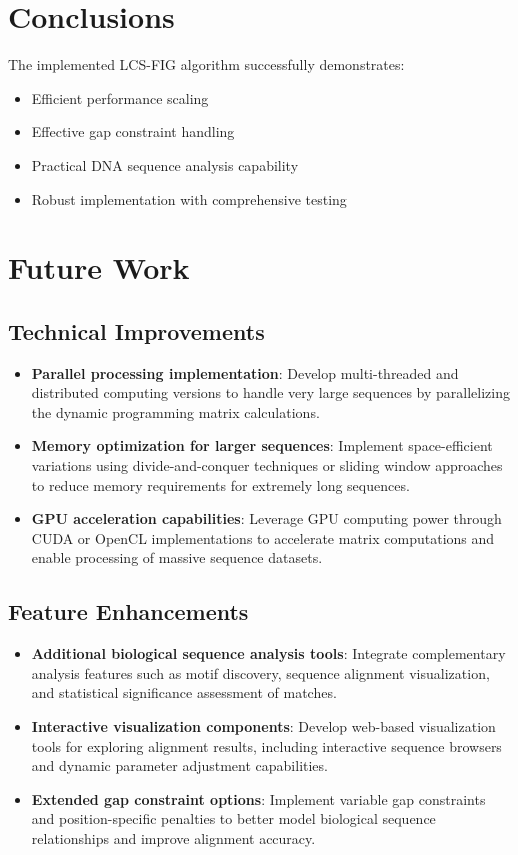 \documentclass[12pt]{article}
\begin{document}
\section{Conclusions}

The implemented LCS-FIG algorithm successfully demonstrates:
\begin{itemize}
    \item Efficient performance scaling
    \item Effective gap constraint handling
    \item Practical DNA sequence analysis capability
    \item Robust implementation with comprehensive testing
\end{itemize}

\section{Future Work}

\subsection{Technical Improvements}
\begin{itemize}
    \item \textbf{Parallel processing implementation}: Develop multi-threaded and distributed computing versions to handle very large sequences by parallelizing the dynamic programming matrix calculations.
    \item \textbf{Memory optimization for larger sequences}: Implement space-efficient variations using divide-and-conquer techniques or sliding window approaches to reduce memory requirements for extremely long sequences.
    \item \textbf{GPU acceleration capabilities}: Leverage GPU computing power through CUDA or OpenCL implementations to accelerate matrix computations and enable processing of massive sequence datasets.
\end{itemize}

\subsection{Feature Enhancements}
\begin{itemize}
    \item \textbf{Additional biological sequence analysis tools}: Integrate complementary analysis features such as motif discovery, sequence alignment visualization, and statistical significance assessment of matches.
    \item \textbf{Interactive visualization components}: Develop web-based visualization tools for exploring alignment results, including interactive sequence browsers and dynamic parameter adjustment capabilities.
    \item \textbf{Extended gap constraint options}: Implement variable gap constraints and position-specific penalties to better model biological sequence relationships and improve alignment accuracy.
\end{itemize}
\end{document}
